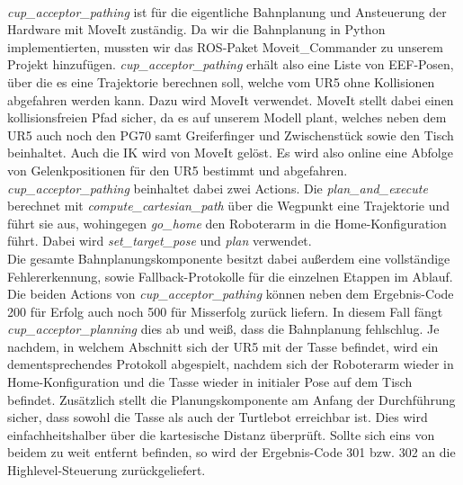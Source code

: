 \newline \\
\textit{cup\_acceptor\_pathing} ist für die eigentliche Bahnplanung und Ansteuerung der Hardware mit MoveIt zuständig. Da wir die Bahnplanung in Python implementierten, mussten wir das ROS-Paket \glqq Moveit\_Commander\grqq \cite{MoveItCommander} zu unserem Projekt hinzufügen. \textit{cup\_acceptor\_pathing} erhält also eine Liste von EEF-Posen, über die es eine Trajektorie berechnen soll, welche vom UR5 ohne Kollisionen abgefahren werden kann. Dazu wird MoveIt verwendet. MoveIt stellt dabei einen kollisionsfreien Pfad sicher, da es auf unserem Modell plant, welches neben dem UR5 auch noch den PG70 samt Greiferfinger und Zwischenstück sowie den Tisch beinhaltet. Auch die IK wird von MoveIt gelöst. Es wird also online eine Abfolge von Gelenkpositionen für den UR5 bestimmt und abgefahren. \textit{cup\_acceptor\_pathing} beinhaltet dabei zwei Actions. Die \textit{plan\_and\_execute} berechnet mit \textit{compute\_cartesian\_path} über die Wegpunkt eine Trajektorie und führt sie aus, wohingegen \textit{go\_home} den Roboterarm in die Home-Konfiguration führt. Dabei wird \textit{set\_target\_pose} und \textit{plan} verwendet.
\newline \\
Die gesamte Bahnplanungskomponente besitzt dabei außerdem eine vollständige Fehlererkennung, sowie Fallback-Protokolle für die einzelnen Etappen im Ablauf. Die beiden Actions von \textit{cup\_acceptor\_pathing} können neben dem Ergebnis-Code 200 für Erfolg auch noch 500 für Misserfolg zurück liefern. In diesem Fall fängt \textit{cup\_acceptor\_planning} dies ab und weiß, dass die Bahnplanung fehlschlug. Je nachdem, in welchem Abschnitt sich der UR5 mit der Tasse befindet, wird ein dementsprechendes Protokoll abgespielt, nachdem sich der Roboterarm wieder in Home-Konfiguration und die Tasse wieder in initialer Pose auf dem Tisch befindet. Zusätzlich stellt die Planungskomponente am Anfang der Durchführung sicher, dass sowohl die Tasse als auch der Turtlebot erreichbar ist. Dies wird einfachheitshalber über die kartesische Distanz überprüft. Sollte sich eins von beidem zu weit entfernt befinden, so wird der Ergebnis-Code 301 bzw. 302 an die Highlevel-Steuerung zurückgeliefert.
